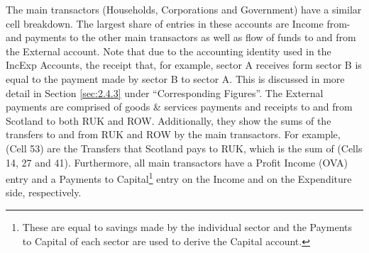 The main transactors (Households, Corporations and Government) have a similar cell breakdown. The largest share of entries in these accounts are Income from- and payments to the other main transactors as well as flow of funds to and from the External account. Note that due to the accounting identity used in the IncExp Accounts, the receipt that, for example, sector A receives form sector B is equal to the payment made by sector B to sector A. This is discussed in more detail in Section \ref{sec:2.4.3} under ``Corresponding Figures''. The External payments are comprised of goods \& services payments and receipts to and from Scotland to both RUK and ROW. Additionally, they show the sums of the transfers to and from RUK and ROW by the main transactors. For example, (Cell 53) are the Transfers that Scotland pays to RUK, which is the sum of (Cells 14, 27 and 41). Furthermore, all main transactors have a Profit Income (OVA) entry and a Payments to Capital\footnote{These are equal to savings made by the individual sector and the Payments to Capital of each sector are used to derive the Capital account.} entry on the Income and on the Expenditure side, respectively.




